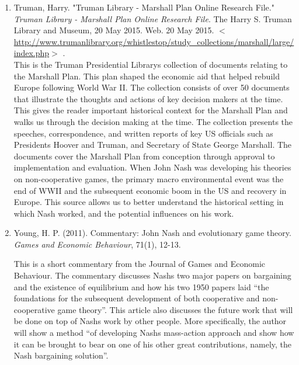 \documentclass[11pt]{article}
\begin{document}
\begin{enumerate}
\item Truman, Harry. "Truman Library - Marshall Plan Online Research File."  \textit{Truman Library - Marshall Plan Online Research File}. The Harry S. Truman Library and Museum, 20 May 2015. Web. 20 May 2015.  $<$ \url{http://www.trumanlibrary.org/whistlestop/study_collections/marshall/large/index.php}$>$ .\\

This is the Truman Presidential Library\textsc{}s collection of documents relating to the Marshall Plan. This plan shaped the economic aid that helped rebuild Europe following World War II. The collection consists of over 50 documents that illustrate the thoughts and actions of key decision makers at the time. This gives the reader important historical context for the Marshall Plan and walks us through the decision making at the time. The collection presents the speeches, correspondence, and written reports of key US officials such as Presidents Hoover and Truman, and Secretary of State George Marshall. The documents cover the Marshall Plan from conception through approval to implementation and evaluation. When John Nash was developing his theories on non-cooperative games, the primary macro environmental event was the end of WWII and the subsequent economic boom in the US and recovery in Europe. This source allows us to better understand the historical setting in which Nash worked, and the potential influences on his work.\\



\item Young, H. P. (2011). Commentary: John Nash and evolutionary game theory. \textit{Games and Economic Behaviour}, 71(1), 12-13.

This is a short commentary from the Journal of Games and Economic Behaviour. The commentary discusses Nash\textsc{}s two major papers on bargaining and the existence of equilibrium and how his two 1950 papers laid ``the foundations for the subsequent development of both cooperative and non-cooperative game theory''. This article also discusses the future work that will be done on top of Nash\textsc{}s work by other people. More specifically, the author will show a method ``of developing Nash\textsc{}s mass-action approach and show how it can be brought to bear on one of his other great contributions, namely, the Nash bargaining solution''.
\end{enumerate}
\end{document}
